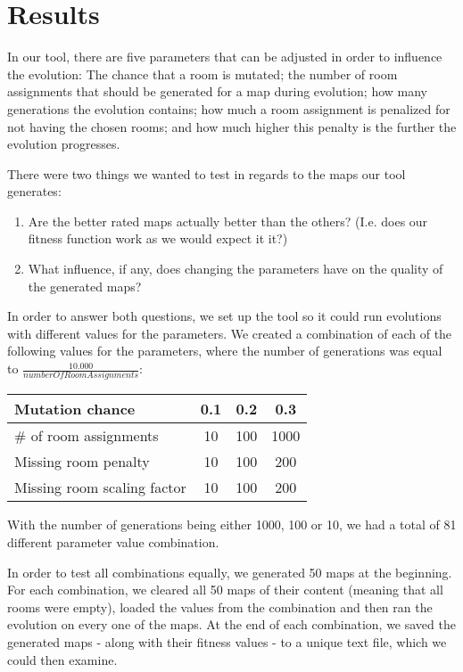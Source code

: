 \section{Results}
\label{05}

In our tool, there are five parameters that can be adjusted in order to influence the evolution: The chance that a room is mutated; the number of room assignments that should be generated for a map during evolution; how many generations the evolution contains; how much a room assignment is penalized for not having the chosen rooms; and how much higher this penalty is the further the evolution progresses.

There were two things we wanted to test in regards to the maps our tool generates:

\begin{enumerate}

	\item Are the better rated maps actually better than the others? (I.e. does our fitness function work as we would expect it it?)

	\item What influence, if any, does changing the parameters have on the quality of the generated maps?

\end{enumerate}

In order to answer both questions, we set up the tool so it could run evolutions with different values for the parameters. We created a combination of each of the following values for the parameters, where the number of generations was equal to $\frac{10.000}{numberOfRoomAssignments}$:

\begin{center}
	\begin{tabular}{| l | c | c | c | }
		\hline
	  	Mutation chance 			& 0.1 & 0.2 & 0.3 \\ \hline
	  	\# of room assignments 		& 10 & 100 & 1000 \\ \hline
	 	Missing room penalty 		& 10 & 100 & 200 \\ \hline
	  	Missing room scaling factor 	& 10 & 100 & 200 \\ \hline
	\end{tabular}
\end{center}

With the number of generations being either 1000, 100 or 10, we had a total of 81 different parameter value combination. 

In order to test all combinations equally, we generated 50 maps at the beginning. For each combination, we cleared all 50 maps of their content (meaning that all rooms were empty), loaded the values from the combination and then ran the evolution on every one of the maps. At the end of each combination, we saved the generated maps - along with their fitness values - to a unique text file, which we could then examine.

